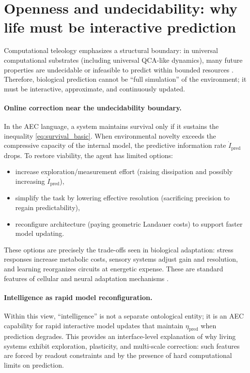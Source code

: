 \section{Openness and undecidability: why life must be interactive prediction}
\label{sec:openness}

Computational teleology emphasizes a structural boundary: in universal computational substrates (including universal QCA-like dynamics), many future properties are undecidable or infeasible to predict within bounded resources \cite{Turing1936,Rice1953,Ma2025CT}.
Therefore, biological prediction cannot be ``full simulation'' of the environment; it must be interactive, approximate, and continuously updated.

\paragraph{Online correction near the undecidability boundary.}
In the AEC language, a system maintains survival only if it sustains the inequality \eqref{eq:survival_basic}.
When environmental novelty exceeds the compressive capacity of the internal model, the predictive information rate $\dot I_{\mathrm{pred}}$ drops.
To restore viability, the agent has limited options:
\begin{itemize}
  \item increase exploration/measurement effort (raising dissipation and possibly increasing $\dot I_{\mathrm{pred}}$),
  \item simplify the task by lowering effective resolution (sacrificing precision to regain predictability),
  \item reconfigure architecture (paying geometric Landauer costs) to support faster model updating.
\end{itemize}
These options are precisely the trade-offs seen in biological adaptation: stress responses increase metabolic costs, sensory systems adjust gain and resolution, and learning reorganizes circuits at energetic expense.
These are standard features of cellular and neural adaptation mechanisms \cite{Alberts2014,Friston2010}.

\paragraph{Intelligence as rapid model reconfiguration.}
Within this view, ``intelligence'' is not a separate ontological entity; it is an AEC capability for rapid interactive model updates that maintain $\eta_{\mathrm{pred}}$ when prediction degrades.
This provides an interface-level explanation of why living systems exhibit exploration, plasticity, and multi-scale correction: such features are forced by readout constraints and by the presence of hard computational limits on prediction.


